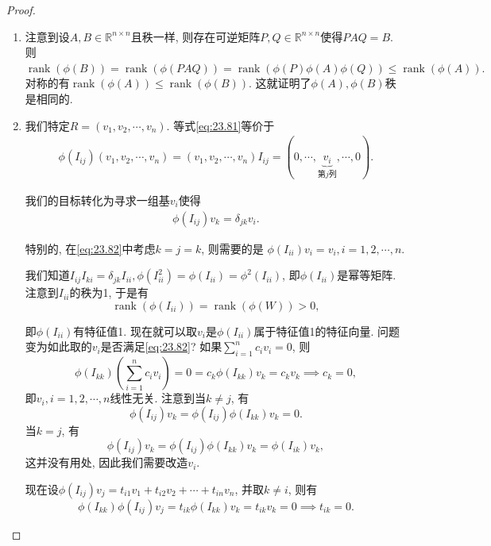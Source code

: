 \documentclass[../../main.tex]{subfiles}%
\begin{document}
\begin{proof}
\begin{enumerate}[(1)]
\item 注意到设$A,B \in \mathbb{R}^{n \times n}$且秩一样, 则存在可逆矩阵$P,Q \in \mathbb{R}^{n \times n}$使得$PAQ = B$. 则
$\operatorname{rank}(\phi(B)) = \operatorname{rank}(\phi(PAQ)) = \operatorname{rank}(\phi(P)\phi(A)\phi(Q)) \leqslant \operatorname{rank}(\phi(A)).$
对称的有$\operatorname{rank}(\phi(A)) \leqslant \operatorname{rank}(\phi(B))$. 这就证明了$\phi(A),\phi(B)$秩是相同的.

\item 我们特定$R = (v_1,v_2,\cdots,v_n)$. 等式\eqref{eq:23.81}等价于
\begin{align*}
\phi (I_{ij})(v_1,v_2,\cdots ,v_n)=(v_1,v_2,\cdots ,v_n)I_{ij}=\left( 0,\cdots ,\underset{\text{第}j\text{列}}{\underbrace{v_i}},\cdots ,0 \right) .
\end{align*}

我们的目标转化为寻求一组基$v_i$使得
\begin{align}
\phi(I_{ij})v_k = \delta_{jk}v_i. \label{eq:23.82}
\end{align}

特别的, 在\eqref{eq:23.82}中考虑$k = j = k$, 则需要的是
$\phi(I_{ii})v_i = v_i, i = 1,2,\cdots,n.$

我们知道$I_{ij}I_{ki} = \delta_{jk}I_{ii}, \phi(I_{ii}^2) = \phi(I_{ii}) = \phi^2(I_{ii})$, 即$\phi(I_{ii})$是幂等矩阵. 注意到$I_{ii}$的秩为1, 于是有
$$\operatorname{rank}(\phi(I_{ii})) = \operatorname{rank}(\phi(W)) > 0,$$

即$\phi(I_{ii})$有特征值1. 现在就可以取$v_i$是$\phi(I_{ii})$属于特征值1的特征向量. 问题变为如此取的$v_i$是否满足\eqref{eq:23.82}?
如果$\sum_{i=1}^n c_i v_i = 0$, 则
$$\phi(I_{kk})\left(\sum_{i=1}^n c_i v_i\right) = 0 = c_k \phi(I_{kk})v_k = c_k v_k \implies c_k = 0,$$
即$v_i, i = 1,2,\cdots,n$线性无关.
注意到当$k \neq j$, 有
$$\phi(I_{ij})v_k = \phi(I_{ij})\phi(I_{kk})v_k = 0.$$
当$k = j$, 有
$$\phi(I_{ij})v_k = \phi(I_{ij})\phi(I_{kk})v_k = \phi(I_{ik})v_k,$$
这并没有用处, 因此我们需要改造$v_i$.

现在设$\phi(I_{ij})v_j = t_{i1}v_1 + t_{i2}v_2 + \cdots + t_{in}v_n$, 并取$k \neq i$, 则有
$$\phi(I_{kk})\phi(I_{ij})v_j = t_{ik}\phi(I_{kk})v_k = t_{ik}v_k = 0 \implies t_{ik} = 0.$$


\end{enumerate}
\end{proof}
\end{document}
